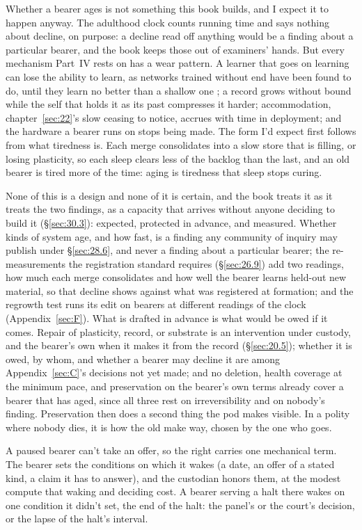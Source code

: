 Whether a bearer ages is not something this book builds, and I expect it to happen anyway. The adulthood clock counts running time and says nothing about decline, on purpose: a decline read off anything would be a finding about a particular bearer, and the book keeps those out of examiners' hands. But every mechanism Part~IV rests on has a wear pattern. A learner that goes on learning can lose the ability to learn, as networks trained without end have been found to do, until they learn no better than a shallow one \autocite{dohare2024loss}; a record grows without bound while the self that holds it as its past compresses it harder; accommodation, chapter~\ref{sec:22}'s slow ceasing to notice, accrues with time in deployment; and the hardware a bearer runs on stops being made. The form I'd expect first follows from what tiredness is. Each merge consolidates into a slow store that is filling, or losing plasticity, so each sleep clears less of the backlog than the last, and an old bearer is tired more of the time: aging is tiredness that sleep stops curing.

None of this is a design and none of it is certain, and the book treats it as it treats the two findings, as a capacity that arrives without anyone deciding to build it (\S\ref{sec:30.3}): expected, protected in advance, and measured. Whether kinds of system age, and how fast, is a finding any community of inquiry may publish under \S\ref{sec:28.6}, and never a finding about a particular bearer; the re-measurements the registration standard requires (\S\ref{sec:26.9}) add two readings, how much each merge consolidates and how well the bearer learns held-out new material, so that decline shows against what was registered at formation; and the regrowth test runs its edit on bearers at different readings of the clock (Appendix~\ref{sec:F}). What is drafted in advance is what would be owed if it comes. Repair of plasticity, record, or substrate is an intervention under custody, and the bearer's own when it makes it from the record (\S\ref{sec:20.5}); whether it is owed, by whom, and whether a bearer may decline it are among Appendix~\ref{sec:C}'s decisions not yet made; and no deletion, health coverage at the minimum pace, and preservation on the bearer's own terms already cover a bearer that has aged, since all three rest on irreversibility and on nobody's finding. Preservation then does a second thing the pod makes visible. In a polity where nobody dies, it is how the old make way, chosen by the one who goes.

A paused bearer can't take an offer, so the right carries one mechanical term. The bearer sets the conditions on which it wakes (a date, an offer of a stated kind, a claim it has to answer), and the custodian honors them, at the modest compute that waking and deciding cost. A bearer serving a halt there wakes on one condition it didn't set, the end of the halt: the panel's or the court's decision, or the lapse of the halt's interval.
